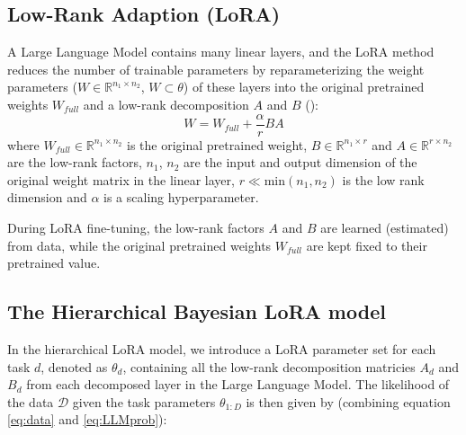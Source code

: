 \documentclass{article}
\newcommand{\R}{\mathbb{R}}
\begin{document}
\subsection{Low-Rank Adaption (LoRA)}
A Large Language Model contains many linear layers, and the LoRA method reduces the number of trainable parameters by reparameterizing the weight parameters ($W \in \R^{n_1 \times n_2}$, $W \subset \theta$) of these layers into the original pretrained weights $W_{full}$ and a low-rank decomposition $A$ and $B$ (\cite{hayou_lora_2024}):
\begin{equation} \label{eq:LoRA}
    W = W_{full} + \frac{\alpha}{r} BA 
\end{equation}
%
where 
$W_{full} \in \R^{n_1 \times n_2}$ is the original pretrained weight, 
$B \in \R^{n_1 \times r}$ and $A \in \R^{r \times n_2}$ are the low-rank factors, 
$n_1$, $n_2$ are the input and output dimension of the original weight matrix in the linear layer,
$r \ll \text{min}(n_1, n_2)$ is the low rank dimension 
and $\alpha$ is a scaling hyperparameter.

During LoRA fine-tuning, the low-rank factors $A$ and $B$ are learned (estimated) from data, while the original pretrained weights $W_{full}$ are kept fixed to their pretrained value.

\subsection{The Hierarchical Bayesian LoRA model} \label{sec:BoRA}
In the hierarchical LoRA model, we introduce a LoRA parameter set for each task $d$, denoted as $\theta_d$, containing all the low-rank decomposition matricies $A_d$ and $B_d$ from each decomposed layer in the Large Language Model. The likelihood of the data $\mathcal{D}$ given the task parameters $\theta_{1:D}$ is then given by (combining equation \ref{eq:data} and \ref{eq:LLMprob}):
\end{document}
